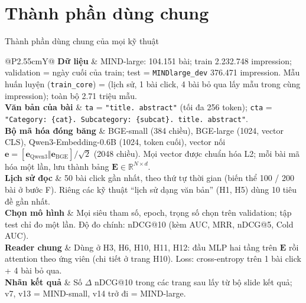\documentclass[aspectratio=169,t]{beamer}
\makeatletter
\newcommand{\code}[1]{\texttt{#1}}
\newcommand{\bangmota}[1]{{\scriptsize\renewcommand{\arraystretch}{1.1}\setlength{\tabcolsep}{4pt}%
  \begin{tabularx}{\textwidth}{@{}P{2.55cm}Y@{}}\toprule #1 \bottomrule\end{tabularx}}}
\newcommand{\rw}[2]{\textbf{#1} & #2\\ \midrule}
\newcommand{\rwl}[2]{\textbf{#1} & #2\\}
\makeatother
\begin{document}
\section{Thành phần dùng chung}
\begin{frame}[shrink]{Thành phần dùng chung của mọi kỹ thuật}
\bangmota{
\rw{Dữ liệu}{MIND-large: 104.151 bài; train 2.232.748 impression; validation = ngày cuối của train; test = \code{MINDlarge\_dev} 376.471 impression. Mẫu huấn luyện (\code{train\_core}) = (lịch sử, 1 bài click, 4 bài bỏ qua lấy mẫu trong cùng impression); toàn bộ 2.71 triệu mẫu.}
\rw{Văn bản của bài}{\code{ta} = \code{"title. abstract"} (tối đa 256 token); \code{cta} = \code{"Category: \{cat\}. Subcategory: \{subcat\}. title. abstract"}.}
\rw{Bộ mã hóa đóng băng}{BGE-small (384 chiều), BGE-large (1024, vector CLS), Qwen3-Embedding-0.6B (1024, token cuối), vector nối $\mathbf e=[\mathbf e_{\mathrm{Qwen3}}\Vert\mathbf e_{\mathrm{BGE}}]/\sqrt2$ (2048 chiều). Mọi vector được chuẩn hóa L2; mỗi bài mã hóa một lần, lưu thành bảng $\mathbf E\in\mathbb R^{N\times d}$.}
\rw{Lịch sử đọc}{50 bài click gần nhất, theo thứ tự thời gian (biến thể 100 / 200 bài ở bước F). Riêng các kỹ thuật ``lịch sử dạng văn bản'' (H1, H5) dùng 10 tiêu đề gần nhất.}
\rw{Chọn mô hình}{Mọi siêu tham số, epoch, trọng số chọn trên validation; tập test chỉ đo một lần. Độ đo chính: nDCG@10 (kèm AUC, MRR, nDCG@5, Cold AUC).}
\rw{Reader chung}{Dùng ở H3, H6, H10, H11, H12: đầu MLP hai tầng trên $\mathbf E$ rồi attention theo ứng viên (chi tiết ở trang H10). Loss: cross-entropy trên 1 bài click + 4 bài bỏ qua.}
\rwl{Nhãn kết quả}{Số $\Delta$ nDCG@10 trong các trang sau lấy từ bộ slide kết quả; v7, v13 = MIND-small, v14 trở đi = MIND-large.}
}
\par\kern0pt
\end{frame}
\end{document}
